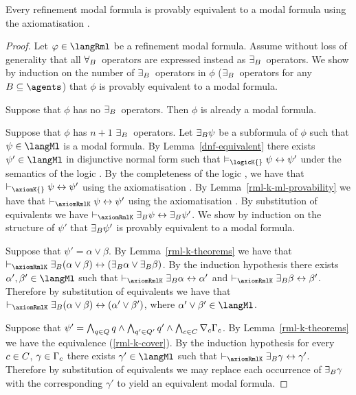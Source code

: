 \begin{lemma}\label{rml-k-ml-equivalent}
Every refinement modal formula is provably equivalent to a modal formula using the axiomatisation \axiomRmlK{}.
\end{lemma}

\begin{proof}
Let $\phi \in \langRml$ be a refinement modal formula.
Assume without loss of generality that all ${\forall_{B}}$~operators are expressed instead as ${\exists_{B}}$~operators.
We show by induction on the number of ${\exists_{B}}$~operators in $\phi$ (${\exists_{B}}$~operators for any $\agentsB \subseteq \agents$) that $\phi$ is provably equivalent to a modal formula.

Suppose that $\phi$ has no ${\exists_{B}}$~operators.
Then $\phi$ is already a modal formula.

Suppose that $\phi$ has $n + 1$ ${\exists_{B}}$~operators.
Let ${\exists_{B}} \psi$ be a subformula of $\phi$ such that $\psi \in \langMl$ is a modal formula.
By Lemma~\ref{dnf-equivalent} there exists $\psi' \in \langMl$ in disjunctive normal form such that $\entails_\logicK{} \psi \iff \psi'$ under the semantics of the logic \logicK{}.
By the completeness of the logic \logicK{}, we have that $\proves_\axiomK{} \psi \iff \psi'$ using the axiomatisation \axiomK{}.
By Lemma~\ref{rml-k-ml-provability} we have that $\proves_\axiomRmlK \psi \iff \psi'$ using the axiomatisation \axiomRmlK{}.
By substitution of equivalents we have $\proves_\axiomRmlK \somerefsBs \psi \iff \somerefsBs \psi'$.
We show by induction on the structure of $\psi'$ that ${\exists_{B}} \psi'$ is provably equivalent to a modal formula.

Suppose that $\psi' = \alpha \lor \beta$.
By Lemma~\ref{rml-k-theorems} we have that $\proves_\axiomRmlK \somerefsBs (\alpha \lor \beta) \iff (\somerefsBs \alpha \lor \somerefsBs \beta)$.
By the induction hypothesis there exists $\alpha', \beta' \in \langMl$ such that $\proves_\axiomRmlK \somerefsBs \alpha \iff \alpha'$ and $\proves_\axiomRmlK \somerefsBs \beta \iff \beta'$.
Therefore by substitution of equivalents we have that $\proves_\axiomRmlK \somerefsBs (\alpha \lor \beta) \iff (\alpha' \lor \beta')$, where $\alpha' \lor \beta' \in \langMl$.

Suppose that $\psi' = \bigwedge_{q \in Q} q \land \bigwedge_{q' \in Q'} q' \land \bigwedge_{c \in C} \nabla_{c} \Gamma_c$.
By Lemma~\ref{rml-k-theorems} we have the equivalence (\ref{rml-k-cover}).
By the induction hypothesis for every $c \in C$, $\gamma \in \Gamma_c$ there exists $\gamma' \in \langMl$ such that $\proves_\axiomRmlK \somerefsBs \gamma \iff \gamma'$.
Therefore by substitution of equivalents we may replace each occurrence of ${\exists_{B}} \gamma$ with the corresponding $\gamma'$ to yield an equivalent modal formula. 


\end{proof}
